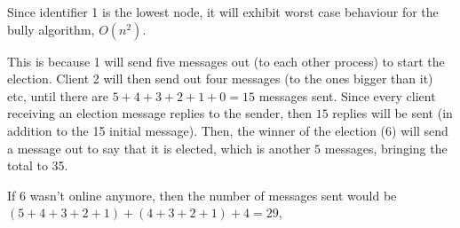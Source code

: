 
Since identifier 1 is the lowest node, it will exhibit worst case behaviour for
the bully algorithm, $O(n^2)$.

This is because 1 will send five messages out (to each other process) to start
the election. Client 2 will then send out four messages (to the ones bigger than
it) etc, until there are $5 + 4 + 3 + 2 + 1 + 0 = 15$ messages sent. Since every
client receiving an election message replies to the sender, then $15$ replies
will be sent (in addition to the 15 initial message). Then, the winner of the
election (6) will send a message out to say that it is elected, which is another
$5$ messages, bringing the total to 35.


If 6 wasn't online anymore, then the number of messages sent would be $(5 + 4 +
3 + 2 + 1) + (4 + 3 + 2 + 1) + 4 = 29$,
